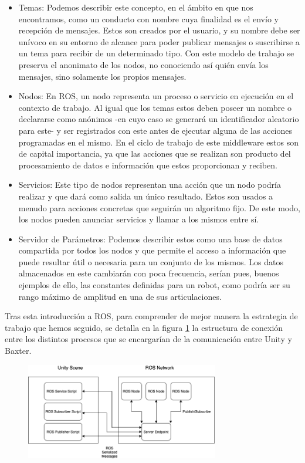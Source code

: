 \begin{itemize}
    \item Temas: Podemos describir este concepto, en el ámbito en que nos encontramos, como un conducto con nombre cuya finalidad es el envío y recepción de mensajes. Estos son creados por el usuario, y su nombre debe ser unívoco en su entorno de alcance para poder publicar mensajes o suscribirse a un tema para recibir de un determinado tipo. Con este modelo de trabajo se preserva el anonimato de los nodos, no conociendo así quién envía los mensajes, sino solamente los propios mensajes. 
    
    \item Nodos: En ROS, un nodo representa un proceso o servicio en ejecución en el contexto de trabajo. Al igual que los temas estos deben poseer un nombre o declararse como anónimos -en cuyo caso se generará un identificador aleatorio para este- y ser registrados con este antes de ejecutar alguna de las acciones programadas en el mismo. En el ciclo de trabajo de este middleware estos son de capital importancia, ya que las acciones que se realizan son producto del procesamiento de datos e información que estos proporcionan y reciben. 

    
    \item Servicios: Este tipo de nodos representan una acción que un nodo podría realizar y que dará como salida un único resultado. Estos son usados a menudo para acciones concretas que seguirán un algoritmo fijo. De este modo, los nodos pueden anunciar servicios y llamar a los mismos entre sí. 
    
    \item Servidor de Parámetros: Podemos describir estos como una base de datos compartida por todos los nodos y que permite el acceso a información que puede resultar útil o necesaria para un conjunto de los mismos. Los datos almacenados en este cambiarán con poca frecuencia, serían pues, buenos ejemplos de ello, las constantes definidas para un robot, como podría ser su rango máximo de amplitud en una de sus articulaciones. 
\end{itemize}

Tras esta introducción a ROS, para comprender de mejor manera la estrategia de trabajo que hemos seguido, se detalla en la figura \ref{Fig:Estructura_Conexion_Unity_ROS} la estructura de conexión entre los distintos procesos que se encargarían de la comunicación entre Unity y Baxter.

\begin{figure}[hbt]
    \centering
    \includegraphics[width=0.75\textwidth]{imagenes/unity_ros.png}
    \caption{\cite{89}}
    \label{Fig:Estructura_Conexion_Unity_ROS}
\end{figure}


